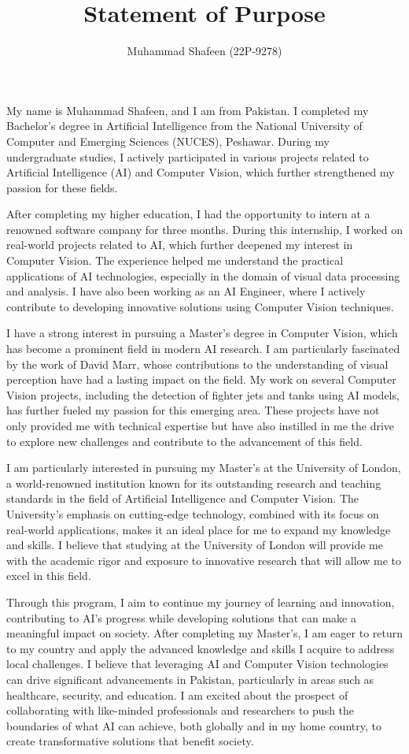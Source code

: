 \documentclass[a4paper,12pt]{article}
\title{Statement of Purpose}
\author{Muhammad Shafeen (22P-9278)}
\date{}
\begin{document}
\maketitle

\doublespacing
\justifying %


My name is Muhammad Shafeen, and I am from Pakistan. I completed my Bachelor's degree in Artificial Intelligence from the National University of Computer and Emerging Sciences (NUCES), Peshawar. During my undergraduate studies, I actively participated in various projects related to Artificial Intelligence (AI) and Computer Vision, which further strengthened my passion for these fields.

After completing my higher education, I had the opportunity to intern at a renowned software company for three months. During this internship, I worked on real-world projects related to AI, which further deepened my interest in Computer Vision. The experience helped me understand the practical applications of AI technologies, especially in the domain of visual data processing and analysis. I have also been working as an AI Engineer, where I actively contribute to developing innovative solutions using Computer Vision techniques.

I have a strong interest in pursuing a Master's degree in Computer Vision, which has become a prominent field in modern AI research. I am particularly fascinated by the work of David Marr, whose contributions to the understanding of visual perception have had a lasting impact on the field. My work on several Computer Vision projects, including the detection of fighter jets and tanks using AI models, has further fueled my passion for this emerging area. These projects have not only provided me with technical expertise but have also instilled in me the drive to explore new challenges and contribute to the advancement of this field.

I am particularly interested in pursuing my Master's at the University of London, a world-renowned institution known for its outstanding research and teaching standards in the field of Artificial Intelligence and Computer Vision. The University's emphasis on cutting-edge technology, combined with its focus on real-world applications, makes it an ideal place for me to expand my knowledge and skills. I believe that studying at the University of London will provide me with the academic rigor and exposure to innovative research that will allow me to excel in this field.

Through this program, I aim to continue my journey of learning and innovation, contributing to AI's progress while developing solutions that can make a meaningful impact on society. After completing my Master’s, I am eager to return to my country and apply the advanced knowledge and skills I acquire to address local challenges. I believe that leveraging AI and Computer Vision technologies can drive significant advancements in Pakistan, particularly in areas such as healthcare, security, and education. I am excited about the prospect of collaborating with like-minded professionals and researchers to push the boundaries of what AI can achieve, both globally and in my home country, to create transformative solutions that benefit society.
\end{document}
